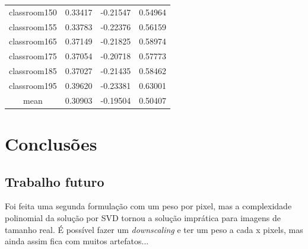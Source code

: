 \documentclass[cic,tc]{iiufrgs}
\begin{document}
\begin{table}[h]
\begin{tabular}{|c|c|c|c|}
          classroom150 & 0.33417 & -0.21547 & 0.54964 \\
          classroom155 & 0.33783 & -0.22376 & 0.56159 \\
          classroom165 & 0.37149 & -0.21825 & 0.58974 \\
          classroom175 & 0.37054 & -0.20718 & 0.57773 \\
          classroom185 & 0.37027 & -0.21435 & 0.58462 \\
          classroom195 & 0.39620 & -0.23381 & 0.63001 \\
          \hline
          \hline
		  mean & 0.30903 & -0.19504 & 0.50407 \\
          \hline
        \end{tabular}
    \vspace{0.5em}
    \label{tbl:results1}
\end{table}


\chapter{Conclusões}

\section{Trabalho futuro}
Foi feita uma segunda formulação com um peso por pixel, mas a complexidade polinomial da solução por SVD tornou a solução imprática para imagens de tamanho real. É possível fazer um \textit{downscaling} e ter um peso a cada x pixels, mas ainda assim fica com muitos artefatos...



\end{document}
